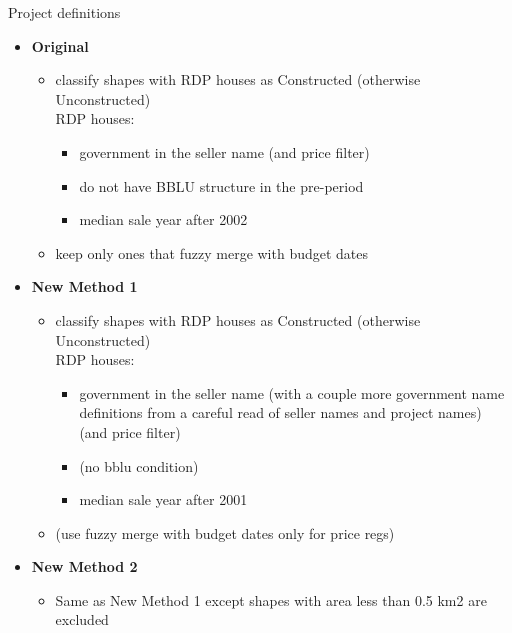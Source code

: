 \documentclass[12pt]{article}
\begin{document}
Project definitions

\begin{itemize}
    \item \textbf{Original}
        \begin{itemize}
            \item classify shapes with RDP houses as Constructed (otherwise Unconstructed) \\[.5em]
            RDP houses:
                \begin{itemize}
                    \item government in the seller name (and price filter)
                    \item do not have BBLU structure in the pre-period
                    \item median sale year after 2002
                \end{itemize}
            \item keep only ones that fuzzy merge with budget dates
        \end{itemize}

    \item \textbf{New Method 1}
        \begin{itemize}
            \item classify shapes with RDP houses as Constructed (otherwise Unconstructed) \\[.5em]
            RDP houses:
                \begin{itemize}
                    \item government in the seller name (with a couple more government name definitions from a careful read of seller names and project names) (and price filter)
                    \item (no bblu condition)
                    \item median sale year after 2001
                \end{itemize}
            \item (use fuzzy merge with budget dates only for price regs)
        \end{itemize}

    \item \textbf{New Method 2}
        \begin{itemize}
            \item Same as New Method 1 except shapes with area less than 0.5 km2 are excluded
        \end{itemize}


\end{itemize}
\end{document}
